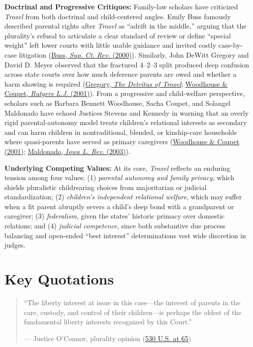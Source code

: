 \documentclass[12pt]{article}
\begin{document}
\textbf{Doctrinal and Progressive Critiques:} Family-law scholars have criticized \textit{Troxel} from both doctrinal and child-centered angles. Emily Buss famously described parental rights after \textit{Troxel} as ``adrift in the middle,'' arguing that the plurality's refusal to articulate a clear standard of review or define ``special weight'' left lower courts with little usable guidance and invited costly case-by-case litigation (\href{https://chicagounbound.uchicago.edu/supremecourtrev/vol2000/iss1/7/}{Buss, \textit{Sup. Ct. Rev.} (2000)}). Similarly, John DeWitt Gregory and David D. Meyer observed that the fractured 4--2--3 split produced deep confusion across state courts over how much deference parents are owed and whether a harm showing is required (\href{https://scholarlycommons.law.hofstra.edu/cgi/viewcontent.cgi?referer=&httpsredir=1&article=1144&context=faculty_scholarship}{Gregory, \textit{The Detritus of Troxel}}; \href{https://lawecommons.luc.edu/cgi/viewcontent.cgi?referer=&httpsredir=1&article=1283&context=facpubs}{Woodhouse \& Coupet, \textit{Rutgers L.J.} (2001)}). From a progressive and child-welfare perspective, scholars such as Barbara Bennett Woodhouse, Sacha Coupet, and Solangel Maldonado have echoed Justices Stevens and Kennedy in warning that an overly rigid parental-autonomy model treats children's relational interests as secondary and can harm children in nontraditional, blended, or kinship-care households where quasi-parents have served as primary caregivers (\href{https://lawecommons.luc.edu/cgi/viewcontent.cgi?referer=&httpsredir=1&article=1283&context=facpubs}{Woodhouse \& Coupet (2001)}; \href{https://www.semanticscholar.org/paper/When-Father-(or-Mother)-Doesn\%27t-Know-Best\%3A-and-V.-Maldonado/850aa01eb77f26db562bdf0358f9a455385dfa6e}{Maldonado, \textit{Iowa L. Rev.} (2003)}).

\textbf{Underlying Competing Values:} At its core, \textit{Troxel} reflects an enduring tension among four values: (1) \textit{parental autonomy and family privacy}, which shields pluralistic childrearing choices from majoritarian or judicial standardization; (2) \textit{children's independent relational welfare}, which may suffer when a fit parent abruptly severs a child's deep bond with a grandparent or caregiver; (3) \textit{federalism}, given the states' historic primacy over domestic relations; and (4) \textit{judicial competence}, since both substantive due process balancing and open-ended ``best interest'' determinations vest wide discretion in judges.

\section{Key Quotations}
\begin{quote}
``The liberty interest at issue in this case---the interest of parents in the care, custody, and control of their children---is perhaps the oldest of the fundamental liberty interests recognized by this Court.''
\begin{flushright}--- Justice O'Connor, plurality opinion (\href{https://www.law.cornell.edu/supremecourt/text/99-138}{530 U.S. at 65})\end{flushright}
\end{quote}
\end{document}
